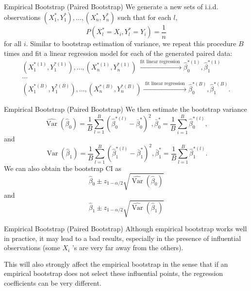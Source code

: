 \documentclass[
  ignorenonframetext,
]{beamer}
\begin{document}
\begin{frame}{Empirical Bootstrap (Paired Bootstrap)}
\protect{}\label{empirical-bootstrap-paired-bootstrap}
We generate a new sets of i.i.d. observations
\(\left(X_1^*, Y_1^*\right), \ldots,\left(X_n^*, Y_n^*\right)\) such
that for each \(l\), \[
P\left(X_l^*=X_i, Y_l^*=Y_i\right)=\frac{1}{n}
\] for all \(i\). Similar to bootstrap estimation of variance, we repeat
this procedure \(B\) times and fit a linear regression model for each of
the generated paired data: \[
\begin{gathered}
\left(X_1^{*(1)}, Y_1^{*(1)}\right), \ldots,\left(X_n^{*(1)}, Y_n^{*(1)}\right) \stackrel{\text { fit linear regression }}{\longrightarrow} \hat{\beta}_0^{*(1)}, \hat{\beta}_1^{*(1)} \\
\ldots \\
\left(X_1^{*(B)}, Y_1^{*(B)}\right), \ldots,\left(X_n^{*(B)}, Y_n^{*(B)}\right) \stackrel{\text { fit linear regression }}{\longrightarrow} \hat{\beta}_0^{*(B)}, \hat{\beta}_1^{*(B)} .
\end{gathered}
\]
\end{frame}

\begin{frame}{Empirical Bootstrap (Paired Bootstrap)}
\protect{}\label{empirical-bootstrap-paired-bootstrap-1}
We then estimate the bootstrap variance \[
\hat{\operatorname{Var}}\left(\hat{\beta}_0\right)=\frac{1}{B} \sum_{l=1}^B\left(\hat{\beta}_0^{*(l)}-\bar{\beta}_0^*\right)^2, \bar{\beta}_0^*=\frac{1}{B} \sum_{i=1}^B \hat{\beta}_0^{*(l)},
\] and \[
\hat{\operatorname{Var}}\left(\hat{\beta}_1\right)=\frac{1}{B} \sum_{l=1}^B\left(\hat{\beta}_1^{*(l)}-\bar{\beta}_1^*\right)^2, \bar{\beta}_1^*=\frac{1}{B} \sum_{l=1}^B \hat{\beta}_1^{*(l)} .
\] We can also obtain the bootstrap CI as \[
\hat{\beta}_0 \pm z_{1-\alpha / 2} \sqrt{\hat{\operatorname{Var}}\left(\hat{\beta}_0\right)}
\] and \[
\hat{\beta}_1 \pm z_{1-\alpha / 2} \sqrt{\hat{\operatorname{Var}}\left(\hat{\beta}_1\right)}
\]
\end{frame}

\begin{frame}{Empirical Bootstrap (Paired Bootstrap)}
\protect{}\label{empirical-bootstrap-paired-bootstrap-2}
Although empirical bootstrap works well in practice, it may lead to a
bad results, especially in the presence of influential observations
(some \(X_i\) 's are very far away from the others).

This will also strongly affect the empirical bootstrap in the sense that
if an empirical bootstrap does not select these influential points, the
regression coefficients can be very different.
\end{frame}
\end{document}
